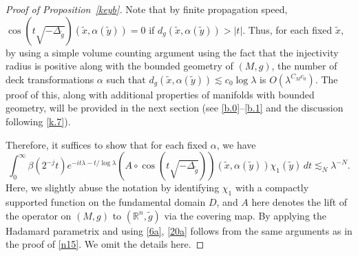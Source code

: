 \documentclass[10pt]{amsart}
\newcommand{\Rn}{{\mathbb R}^n}
\newcommand{\la}{\lambda}
\newcommand{\1}{{\bf 1}}
\begin{document}
\begin{proof}[Proof of Proposition~\ref{keyb}]
Note that by finite propagation speed,  $\cos (t\sqrt{-\Delta_{\tilde g}})(\tilde x,\alpha(\tilde y))=0$ if $d_g(\tilde x,\alpha(\tilde y))>|t|$.
Thus, for each fixed $\tilde x$, by using a simple volume counting argument using the fact that the injectivity radius is positive along with the bounded geometry of $(M,g)$,  the number of deck transformations $\alpha$ such that $d_g(\tilde x,\alpha(\tilde y))\lesssim c_0\log\la$ is $O(\la^{C_Mc_0})$. The proof of this, along with additional properties of manifolds with bounded geometry, will be provided in the next section (see \eqref{b.0}–\eqref{b.1} and the discussion following \eqref{k.7}).


Therefore, it suffices to show that for each fixed $\alpha$, we have
\begin{equation}\label{20a}
\int_0^\infty \beta(2^{-j}t)e^{-it\la-t/\log\la}   (A\circ \cos (t\sqrt{-\Delta_{\tilde g}}))(\tilde x,\alpha(\tilde y))\chi_1(\tilde y)\,dt \lesssim_N \la^{-N}.
\end{equation}
Here, we slightly abuse the notation by identifying $\chi_1$ with a compactly supported function on the fundamental domain $D$, and $A$ here denotes the lift of the operator on $(M,g)$
to $(\Rn,\tilde g)$ via the covering map. By applying the Hadamard parametrix and using \eqref{6a}, \eqref{20a} follows from the same arguments as in the proof of \eqref{n15}. We omit the details here.







\end{proof}
\end{document}

